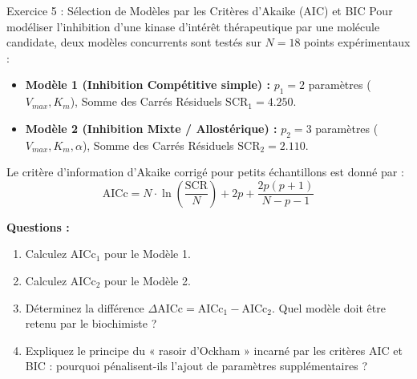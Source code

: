 \documentclass[11pt,a4paper]{article}
\begin{document}
\begin{exercicebox}{Exercice 5 : Sélection de Modèles par les Critères d'Akaike (AIC) et BIC}
Pour modéliser l'inhibition d'une kinase d'intérêt thérapeutique par une molécule candidate, deux modèles concurrents sont testés sur $N = 18$ points expérimentaux :
\begin{itemize}
  \item \textbf{Modèle 1 (Inhibition Compétitive simple) :} $p_1 = 2$ paramètres ($V_{max}, K_m$), Somme des Carrés Résiduels $\text{SCR}_1 = 4.250$.
  \item \textbf{Modèle 2 (Inhibition Mixte / Allostérique) :} $p_2 = 3$ paramètres ($V_{max}, K_m, \alpha$), Somme des Carrés Résiduels $\text{SCR}_2 = 2.110$.
\end{itemize}
Le critère d'information d'Akaike corrigé pour petits échantillons est donné par :
\begin{equation*}
  \text{AICc} = N \cdot \ln\left(\frac{\text{SCR}}{N}\right) + 2p + \frac{2p(p+1)}{N - p - 1}
\end{equation*}

\textbf{Questions :}
\begin{enumerate}[label=\textbf{\alph*.}]
  \item Calculez $\text{AICc}_1$ pour le Modèle 1.
  \item Calculez $\text{AICc}_2$ pour le Modèle 2.
  \item Déterminez la différence $\Delta\text{AICc} = \text{AICc}_1 - \text{AICc}_2$. Quel modèle doit être retenu par le biochimiste ?
  \item Expliquez le principe du « rasoir d'Ockham » incarné par les critères AIC et BIC : pourquoi pénalisent-ils l'ajout de paramètres supplémentaires ?
\end{enumerate}
\end{exercicebox}
\end{document}
